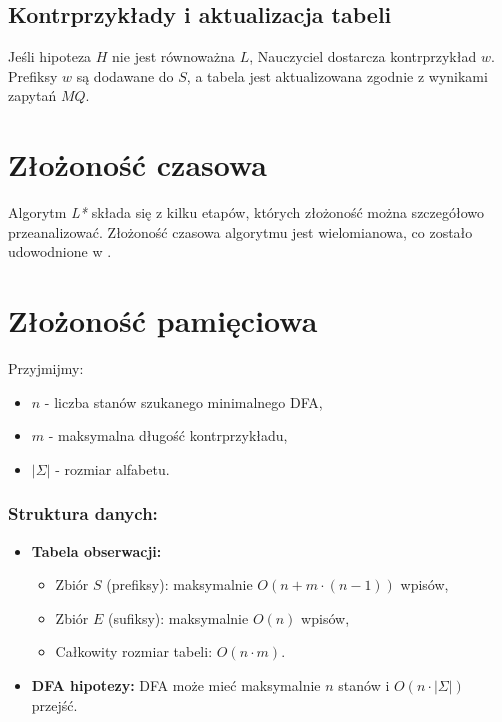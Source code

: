 \subsection{Kontrprzykłady i aktualizacja tabeli}

Jeśli hipoteza \( H \) nie jest równoważna \( L \), Nauczyciel dostarcza kontrprzykład \( w \). Prefiksy \( w \) są dodawane do \( S \), a tabela jest aktualizowana zgodnie z wynikami zapytań \( MQ \).

\section{Złożoność czasowa}

Algorytm \textit{L*} składa się z kilku etapów, których złożoność można szczegółowo przeanalizować. Złożoność czasowa algorytmu jest wielomianowa, co zostało udowodnione w \cite{L_STAR}.

\section{Złożoność pamięciowa}

Przyjmijmy:
\begin{itemize}
    \item \(n\) - liczba stanów szukanego minimalnego DFA,
    \item \(m\) - maksymalna długość kontrprzykładu,
    \item \(|\Sigma|\) - rozmiar alfabetu.
\end{itemize}

\subsubsection*{Struktura danych:}
\begin{itemize}
    \item \textbf{Tabela obserwacji:}
    \begin{itemize}
        \item Zbiór \(S\) (prefiksy): maksymalnie \(O(n + m \cdot (n - 1))\) wpisów,
        \item Zbiór \(E\) (sufiksy): maksymalnie \(O(n)\) wpisów,
        \item Całkowity rozmiar tabeli: \(O(n \cdot m)\).
    \end{itemize}
    \item \textbf{DFA hipotezy:} DFA może mieć maksymalnie \(n\) stanów i \(O(n \cdot |\Sigma|)\) przejść.
\end{itemize}

